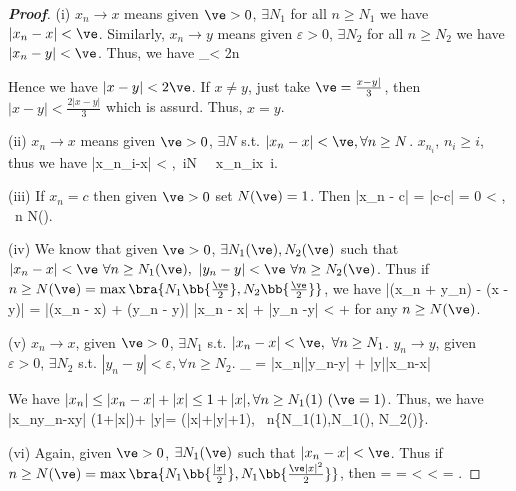 \begin{proof}[\bf Proof]
\ben
\item [(i)] $x_n\to x$ means given $\ve>0$, $\exists N_1$ for all $n\geq N_1$ we have $|x_n-x|<\ve$. Similarly, $x_n\to y$ means given $\varepsilon>0$, $\exists N_2$ for all $n\geq N_2$ we have $|x_n-y|<\ve$. Thus, we have
\be
{}_{}< 2\ve {}n\geq \max{}
\ee

Hence we have $|x-y|<2\ve$. If $x\neq y$, just take $\ve=\frac{x-y|}{3}$, then $|x-y|<\frac{2|x-y|}{3}$ which is assurd. Thus, $x=y$.

\item [(ii)] $x_n\to x$ means given $\ve >0$, $\exists N$ s.t. $|x_n-x|<\ve, \forall n\geq N$. $x_{n_i}$, $n_i\geq i$, thus we have
\be
|x_{n_i}-x| < \varepsilon,\ \forall i\geq N \ \ra \ x_{n_i}\to x\ i\to\infty.
\ee

\item [(iii)] If $x_n = c$ then given $\ve > 0$ set $N(\ve) = 1$. Then
\be
|x_n - c| = |c-c| = 0 < \ve, \ \forall n \geq N(\ve).
\ee

\item [(iv)] We know that given $\ve > 0$, $\exists N_1(\ve),N_2(\ve)$ such that $|x_n - x| < \ve\ \forall n \geq N_1(\ve),\ |y_n - y| < \ve\ \forall n \geq N_2(\ve)$. Thus if $n \geq N(\ve) = \max\bra{N_1\bb{\frac{\ve}2}, N_2\bb{\frac{\ve}2}}$, we have
\be
|(x_n + y_n) - (x - y)| = |(x_n - x) + (y_n - y)| \leq |x_n - x| + |y_n -y| <  + 
\ee
for any $n \geq N(\ve)$.

\item [(v)] $x_n\to x$, given $\ve>0$, $\exists N_1$ s.t. $|x_n-x|<\ve, \ \forall n\geq N_1$. $y_n\to y$, given $\varepsilon>0$, $\exists N_2$ s.t. $|y_n-y|<\varepsilon, \forall n\geq N_2$.
\be
{}_{} = |x_n||y_n-y| + |y||x_n-x|
\ee

We have $|x_n|\leq |x_n-x|+|x|\leq 1+|x|,\forall n\geq N_1(1) \ (\ve=1)$. Thus, we have
\be
|x_ny_n-xy| \leq (1+|x|)\ve + |y|\ve = \ve(|x|+|y|+1), \ \forall n\geq \max\{N_1(1),N_1(\ve), N_2(\ve)\}.
\ee

\item [(vi)] Again, given $\ve > 0$, $\exists N_1(\ve)$ such that $|x_n -x| < \ve$. Thus if $n \geq N(\ve) = \max\bra{N_1\bb{\frac{|x|}{2}}, N_1\bb{\frac{\ve|x|^2}{2}}}$, then
\be
{} =  =  < < \cdot {} = \ve.
\ee


\end{proof}
